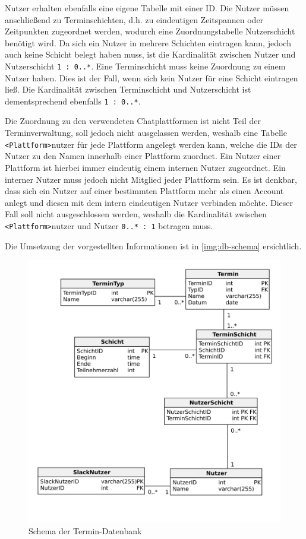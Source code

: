 Nutzer erhalten ebenfalls eine eigene Tabelle mit einer ID. Die Nutzer müssen anschließend zu Terminschichten, d.h. zu eindeutigen Zeitspannen oder Zeitpunkten zugeordnet werden, wodurch eine Zuordnungstabelle Nutzerschicht benötigt wird. Da sich ein Nutzer in mehrere Schichten eintragen kann, jedoch auch keine Schicht belegt haben muss, ist die Kardinalität zwischen Nutzer und Nutzerschicht \texttt{1 : 0..*}. Eine Terminschicht muss keine Zuordnung zu einem Nutzer haben. Dies ist der Fall, wenn sich kein Nutzer für eine Schicht eintragen ließ. Die Kardinalität zwischen Terminschicht und Nutzerschicht ist dementsprechend ebenfalls \texttt{1 : 0..*}.

Die Zuordnung zu den verwendeten Chatplattformen ist nicht Teil der Terminverwaltung, soll jedoch nicht ausgelassen werden, weshalb eine Tabelle \texttt{<Plattform>}nutzer für jede Plattform angelegt werden kann, welche die IDs der Nutzer zu den Namen innerhalb einer Plattform zuordnet. Ein Nutzer einer Plattform ist hierbei immer eindeutig einem internen Nutzer zugeordnet. Ein interner Nutzer muss jedoch nicht Mitglied jeder Plattform sein. Es ist denkbar, dass sich ein Nutzer auf einer bestimmten Plattform mehr als einen Account anlegt und diesen mit dem intern eindeutigen Nutzer verbinden möchte. Dieser Fall soll nicht ausgeschlossen werden, weshalb die Kardinalität zwischen \texttt{<Plattform>}nutzer und Nutzer \texttt{0..* : 1} betragen muss.

Die Umsetzung der vorgestellten Informationen ist in \autoref{img:db-schema} ersichtlich.



\begin{figure}[htbp]
    \includegraphics[width=\textwidth]{../docs/uml/Steckerbot-DB.png}
    \caption{Schema der Termin-Datenbank}
    \label{img:db-schema}
\end{figure}


